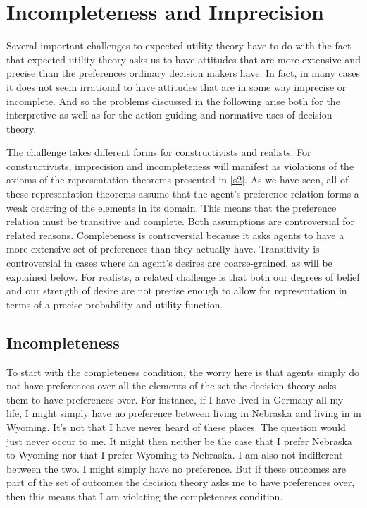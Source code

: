 \section{Incompleteness and Imprecision} \label{s4}

Several important challenges to expected utility theory have to do with the fact that expected utility theory asks us to have attitudes that are more extensive and precise than the preferences ordinary decision makers have. In fact, in many cases it does not seem irrational to have attitudes that are in some way imprecise or incomplete. And so the problems discussed in the following arise both for the interpretive as well as for the action-guiding and normative uses of decision theory.

The challenge takes different forms for constructivists and realists. For constructivists, imprecision and incompleteness will manifest as violations of the axioms of the representation theorems presented in \autoref{s2}. As we have seen, all of these representation theorems assume that the agent's preference relation forms a weak ordering of the elements in its domain. This means that the preference relation must be transitive and complete. Both assumptions are controversial for related reasons. Completeness is controversial because it asks agents to have a more extensive set of preferences than they actually have. Transitivity is controversial in cases where an agent's desires are coarse-grained, as will be explained below. For realists, a related challenge is that both our degrees of belief and our strength of desire are not precise enough to allow for representation in terms of a precise probability and utility function.

\subsection{Incompleteness}\label{subs41}

To start with the completeness condition, the worry here is that agents simply do not have preferences over all the elements of the set the decision theory asks them to have preferences over. For instance, if I have lived in Germany all my life, I might simply have no preference between living in Nebraska and living in in Wyoming. It's not that I have never heard of these places. The question would just never occur to me. It might then neither be the case that I prefer Nebraska to Wyoming nor that I prefer Wyoming to Nebraska. I am also not indifferent between the two. I might simply have no preference. But if these outcomes are part of the set of outcomes the decision theory asks me to have preferences over, then this means that I am violating the completeness condition.

